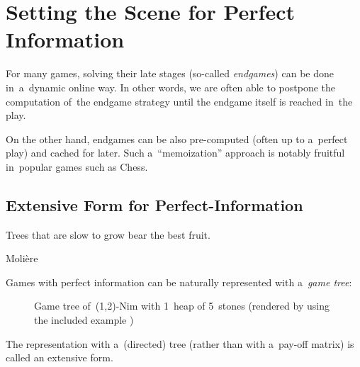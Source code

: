 \chapter{Setting the Scene for Perfect Information}
For many games, solving their late stages (so-called \emph{endgames}) can be done in~a~dynamic online way.
In other words, we are often able to postpone the computation of~the endgame strategy until the endgame itself is reached in~the play.

On the other hand, endgames can be also pre-computed (often up to a~perfect play) and cached for later.
Such a~``memoization'' approach is notably fruitful in~popular games such as Chess.

\section{Extensive Form for Perfect-Information}
\label{sec:extensive-form-perf-info}
\epigraph{Trees that are slow to grow bear the best fruit.}
{Molière}
Games with perfect information can be naturally represented with a~\emph{game tree}:
\begin{figure}[H]
  \centering
  \scriptsize
  \def\svgwidth{.9\textwidth}
  
  \def\captionTitle{Game tree of~(1,2)-Nim with 1~heap of 5~stones}
  \caption[\captionTitle]{\captionTitle{} (rendered by  using the included example )}
  \label{fig:game-tree-nim-5}
\end{figure}
\noindent
The representation with a~(directed) tree (rather than with a~pay-off matrix) is called an extensive form.


